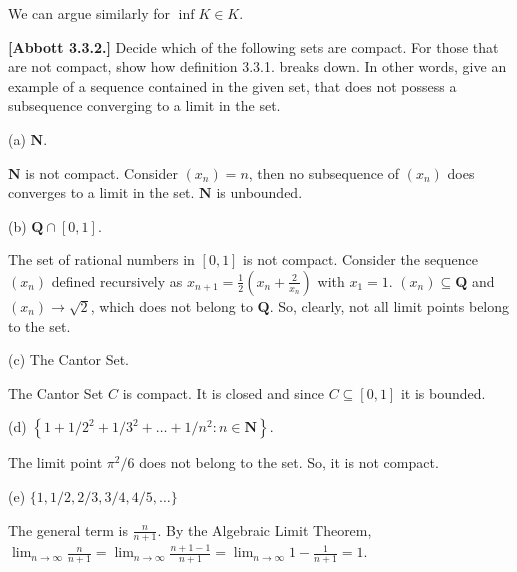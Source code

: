 \documentclass[10pt]{article}
\begin{document}
We can argue similarly for $\displaystyle \inf K\in K$.



\textbf{[Abbott 3.3.2.] }Decide which of the following sets are compact. For those that are not compact, show how definition 3.3.1. breaks down. In other words, give an example of a sequence contained in the given set, that does not possess a subsequence converging to a limit in the set.



(a) $\displaystyle \mathbf{N}$.



$\displaystyle \mathbf{N}$ is not compact. Consider $\displaystyle ( x_{n}) =n$, then no subsequence of $\displaystyle ( x_{n})$ does converges to a limit in the set. $\displaystyle \mathbf{N}$ is unbounded.



(b) $\displaystyle \mathbf{Q} \cap [ 0,1]$.



The set of rational numbers in $\displaystyle [ 0,1]$ is not compact. Consider the sequence $\displaystyle ( x_{n})$ defined recursively as $\displaystyle x_{n+1} =\frac{1}{2}\left( x_{n} +\frac{2}{x_{n}}\right)$ with $\displaystyle x_{1} =1$. $\displaystyle ( x_{n}) \subseteq \mathbf{Q}$ and $\displaystyle ( x_{n})\rightarrow \sqrt{2}$, which does not belong to $\displaystyle \mathbf{Q}$. So, clearly, not all limit points belong to the set. 



(c) The Cantor Set.



The Cantor Set $\displaystyle C$ is compact. It is closed and since $\displaystyle C\subseteq [ 0,1]$ it is bounded. 



(d) $\displaystyle \left\{1+1/2^{2} +1/3^{2} +\dotsc +1/n^{2} :n\in \mathbf{N}\right\}$.



The limit point $\displaystyle \pi ^{2} /6$ does not belong to the set. So, it is not compact.



(e) $\displaystyle \{1,1/2,2/3,3/4,4/5,\dotsc \}$



The general term is $\displaystyle \frac{n}{n+1}$. By the Algebraic Limit Theorem, $\displaystyle \lim _{n\rightarrow \infty }\frac{n}{n+1} =\lim _{n\rightarrow \infty }\frac{n+1-1}{n+1} =\lim _{n\rightarrow \infty } 1-\frac{1}{n+1} =1$.
\end{document}
